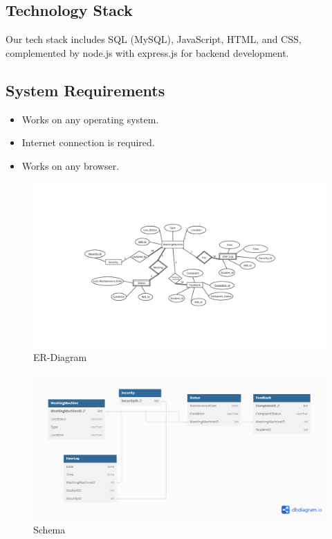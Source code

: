 \documentclass{article}
\begin{document}
\subsection{Technology Stack}
Our tech stack includes SQL (MySQL), JavaScript, HTML, and CSS, complemented by node.js with express.js for backend development. 
\subsection{System Requirements}
\begin{itemize}
\item Works on any operating system.

\item Internet connection is required. 

\item Works on any browser.
\end{itemize}

\begin{figure}
\begin{center}
\includegraphics[width=1\textwidth]{dbms2.jpg}
\end{center}
\caption{ ER-Diagram}

\end{figure}
\begin{figure}
\begin{center}
\includegraphics[width=1\textwidth]{dbms1.jpg}
\end{center}
\caption{ Schema}

\end{figure}
\end{document}
